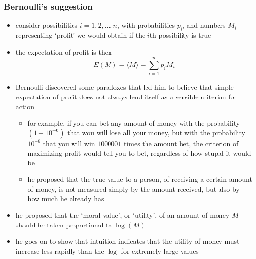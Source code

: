 \documentclass[../jaynes_prob_theory_notes.tex]{subfiles}
\begin{document}
            \subsubsection{Bernoulli's suggestion}
                \begin{itemize} 
                    \item consider possibilities \(i = 1, 2, \ldots, n\), with probabilities \(p_i\), and numbers \(M_i\) representing `profit' we would obtain if the \(i\)th possibility is true
                    \item the expectation of profit is then
                        \begin{equation*} 
                            E(M) = \langle M \rangle = \sum\limits^{n}_{i=1} p_i M_i
                        \end{equation*}
                    \item Bernoulli discovered some paradoxes that led him to believe that simple expectation of profit does not always lend itself as a sensible criterion for action
                        \begin{itemize} 
                            \item for example, if you can bet any amount of money with the probability \((1-10^{-6})\) that wou will lose all your money, but with the probability \(10^{-6}\) that you will win \(1000001\) times the amount bet, the criterion of maximizing profit would tell you to bet, regardless of how stupid it would be
                            \item he proposed that the true value to a person, of receiving a certain amount of money, is not measured simply by the amount received, but also by how much he already has
                        \end{itemize}
                    \item he proposed that the `moral value', or `utility', of an amount of money \(M\) should be taken proportional to \(\log(M)\)
                    \item he goes on to show that intuition indicates that the utility of money must increase less rapidly than the \(\log\) for extremely large values
                \end{itemize}
\end{document}
